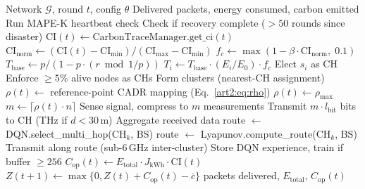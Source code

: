 \begin{algorithm}[!t]
\caption{CALASH Per-Round Operation}
\label{art2:alg:calash}
\begin{algorithmic}[1]
\Require Network $\mathcal{G}$, round $t$, config $\theta$
\Ensure Delivered packets, energy consumed, carbon emitted
    \State Run MAPE-K heartbeat check
    \State Check if recovery complete ($> 50$ rounds since disaster)
\EndIf
{}
\State $\text{CI}(t) \gets \text{CarbonTraceManager.get\_ci}(t)$
\State $\text{CI}_{\text{norm}} \gets (\text{CI}(t) - \text{CI}_{\min}) / (\text{CI}_{\max} - \text{CI}_{\min})$
\State $f_c \gets \max(1 - \beta \cdot \text{CI}_{\text{norm}}, \; 0.1)$
    \State $T_{\text{base}} \gets p / (1 - p \cdot (r \bmod 1/p))$ 
    \State $T_i \gets T_{\text{base}} \cdot (E_i / E_0) \cdot f_c$
     \State Elect $s_i$ as CH \EndIf
\EndFor
\State Enforce $\geq 5\%$ alive nodes as CHs
\State Form clusters (nearest-CH assignment)
\State $\rho(t) \gets$ reference-point CADR mapping (Eq.~\ref{art2:eq:rho})
 \State $\rho(t) \gets \rho_{\max}$ \EndIf
\State $m \gets \lceil \rho(t) \cdot n \rceil$ 
    \State Sense signal, compress to $m$ measurements
    \State Transmit $m \cdot l_{\text{bit}}$ bits to CH (THz if $d < 30$\,m)
\EndFor
{}
    \State Aggregate received data
        \State route $\gets$ DQN.select\_multi\_hop($\text{CH}_k$, BS)
    \Else
        \State route $\gets$ Lyapunov.compute\_route($\text{CH}_k$, BS)
    \EndIf
    \State Transmit along route (sub-6\,GHz inter-cluster)
    \State Store DQN experience, train if buffer $\geq 256$
\EndFor
{}
\State $C_{\text{op}}(t) \gets E_{\text{total}} \cdot J_{\text{kWh}} \cdot \text{CI}(t)$
\State $Z(t+1) \gets \max\{0, Z(t) + C_{\text{op}}(t) - \bar{c}\}$
\State \Return packets delivered, $E_{\text{total}}$, $C_{\text{op}}(t)$
\end{algorithmic}
\end{algorithm}

